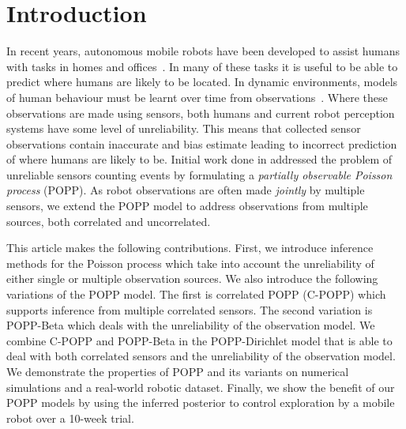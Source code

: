 

\section{Introduction}
\label{sec:introduction}

In recent years, autonomous mobile robots have been developed to assist humans with tasks in homes and offices~\cite{hawes2016strands}. In many of these tasks it is useful to be able to predict where humans are likely to be located. In dynamic environments, models of human behaviour must be learnt over time from observations~\cite{coppola2016learning, duckworth2016}. Where these observations are made using sensors, both humans and current robot perception systems have some level of unreliability. This means that collected sensor observations contain inaccurate and bias estimate leading to incorrect prediction of where humans are likely to be. Initial work done in \cite{jovan18a} addressed the problem of unreliable sensors counting events by formulating a \textit{partially observable Poisson process} (POPP). As robot observations are often made \emph{jointly} by multiple sensors, we extend the POPP model to address observations from multiple sources, both correlated and uncorrelated.

This article makes the following contributions. First, we introduce inference methods for the Poisson process which take into account the unreliability of either single or multiple observation sources. We also introduce the following variations of the POPP model. The first is correlated POPP (C-POPP) which supports inference from multiple correlated sensors. The second variation is POPP-Beta which deals with the unreliability of the observation model. We combine C-POPP and POPP-Beta in the POPP-Dirichlet model that is able to deal with both correlated sensors and the unreliability of the observation model. We demonstrate the properties of POPP and its variants on numerical simulations and a real-world robotic dataset. Finally, we show the benefit of our POPP models by using the inferred posterior to control exploration by a mobile robot over a 10-week trial.

